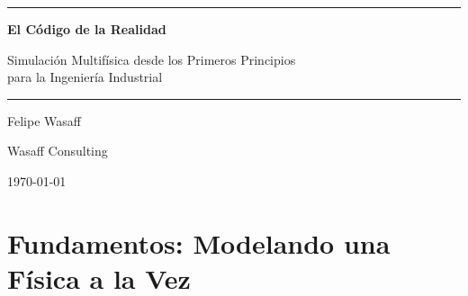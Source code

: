 \documentclass[
    11pt,
    a4paper,
    spanish,
    twoside,
    openright,
    cleardoublepage=empty,
    numbers=noenddot,
    bibliography=totoc,
    index=totoc
]{scrbook}
\begin{document}
\frontmatter

\begin{titlepage}
    \centering
    \vspace*{2cm}
    {\color{wasaff-black}\rule{\textwidth}{1.5pt}}
    \vspace{1.5cm}
    
    {\Huge\bfseries\color{wasaff-black} El Código de la Realidad}
    
    \vspace{0.8cm}
    {\Large\color{wasaff-darkgray}
    Simulación Multifísica desde los Primeros Principios\\
    para la Ingeniería Industrial}
    
    \vspace{1.5cm}
    {\color{wasaff-black}\rule{\textwidth}{1.5pt}}
    
    \vfill
    
    {\large\color{wasaff-darkgray} Felipe Wasaff}
    
    \vspace{0.5cm}
    {\normalsize\color{wasaff-midgray} Wasaff Consulting}
    
    \vspace{1cm}
    {\normalsize\color{wasaff-midgray} \today}
    
    \vspace{2cm}
\end{titlepage}

\cleardoublepage

\cleardoublepage

\cleardoublepage

\tableofcontents
\cleardoublepage


\cleardoublepage

\mainmatter
\pagestyle{scrheadings}

\part{Fundamentos: Modelando una Física a la Vez}


%
\cleardoublepage
\end{document}
